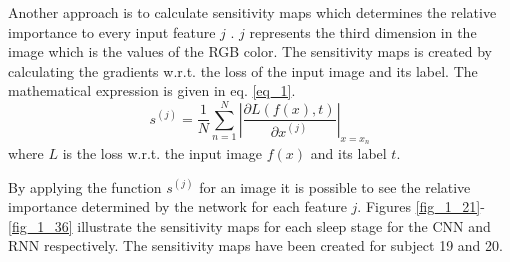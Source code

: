 Another approach is to calculate sensitivity maps which determines the relative importance to every input feature $j$ \cite{main_ar}. $j$ represents the third dimension in the image which is the values of the RGB color.
The sensitivity maps is created by calculating the gradients w.r.t. the loss of the input image and its label. The mathematical expression is given in eq. \ref{eq_1}.
\begin{equation}
s^{\left(j\right)} = \frac { 1 }{ N  } \sum _{ n=1 }^{ N } \left| \frac { \partial L\left( f\left( x \right) ,t \right)  }{ \partial x^{ \left( j \right)  } }  \right| _{x=x_n}
\label{eq_1}
\end{equation}
where $L$ is the loss w.r.t. the input image $f\left(x\right)$ and its label $t$. 

By applying the function $s^{\left(j\right)}$ for an image it is possible to see the relative importance determined by the network for each feature $j$. 
Figures \ref{fig_1_21}-\ref{fig_1_36} illustrate the sensitivity maps for each sleep stage for the CNN and RNN respectively. The sensitivity maps have been created for subject 19 and 20.

%
%
